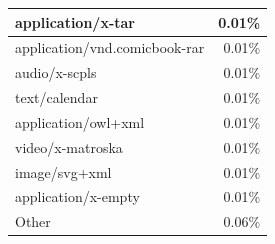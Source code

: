 \documentclass[USenglish,oneside,twocolumn]{article}
\begin{document}
\begin{center}
\begin{supertabular}[H]{p{5.5cm} | r{2.5cm}}
	\hline
	application/x-tar	&	0.01\% \\
	\hline
	application/vnd.comicbook-rar	&	0.01\% \\
	\hline
	audio/x-scpls		&	0.01\% \\
	\hline
	text/calendar		&	0.01\% \\
	\hline
	application/owl+xml	&	0.01\% \\
	\hline
	video/x-matroska	&	0.01\% \\
	\hline
	image/svg+xml		&	0.01\% \\
	\hline
	application/x-empty	&	0.01\% \\
	\hline
	Other				&	0.06\% \\
	\hline
\end{supertabular}
\end{center}

%
%
\end{document}
